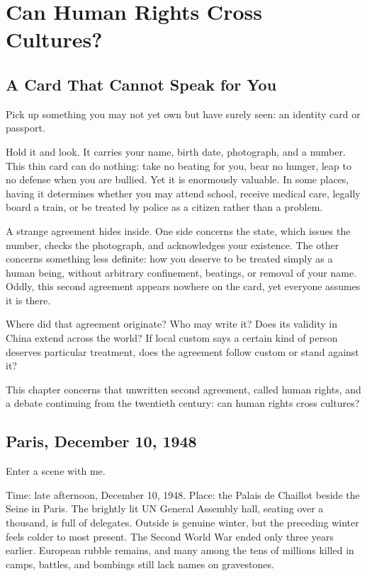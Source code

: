 \chapter{Can Human Rights Cross Cultures?}
\section{A Card That Cannot Speak for You}
Pick up something you may not yet own but have surely seen: an identity card or passport.

Hold it and look. It carries your name, birth date, photograph, and a number. This thin card can do nothing: take no beating for you, bear no hunger, leap to no defense when you are bullied. Yet it is enormously valuable. In some places, having it determines whether you may attend school, receive medical care, legally board a train, or be treated by police as a citizen rather than a problem.

A strange agreement hides inside. One side concerns the state, which issues the number, checks the photograph, and acknowledges your existence. The other concerns something less definite: how you deserve to be treated simply as a human being, without arbitrary confinement, beatings, or removal of your name. Oddly, this second agreement appears nowhere on the card, yet everyone assumes it is there.

Where did that agreement originate? Who may write it? Does its validity in China extend across the world? If local custom says a certain kind of person deserves particular treatment, does the agreement follow custom or stand against it?

This chapter concerns that unwritten second agreement, called human rights, and a debate continuing from the twentieth century: can human rights cross cultures?

\section{Paris, December 10, 1948}
Enter a scene with me.

Time: late afternoon, December 10, 1948. Place: the Palais de Chaillot beside the Seine in Paris. The brightly lit UN General Assembly hall, seating over a thousand, is full of delegates. Outside is genuine winter, but the preceding winter feels colder to most present. The Second World War ended only three years earlier. European rubble remains, and many among the tens of millions killed in camps, battles, and bombings still lack names on gravestones.

